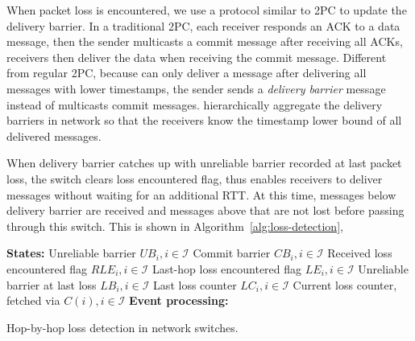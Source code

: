 When packet loss is encountered, we use a protocol similar to 2PC to update the delivery barrier. 
In a traditional 2PC, each receiver responds an ACK to a data message, then the sender multicasts a commit message after receiving all ACKs, receivers then deliver the data when receiving the commit message.
Different from regular 2PC, because \sys can only deliver a message after delivering all messages with lower timestamps, the sender sends a \textit{delivery barrier} message instead of multicasts commit messages. \sys hierarchically aggregate the delivery barriers in network so that the receivers know the timestamp lower bound of all delivered messages.

When delivery barrier catches up with unreliable barrier recorded at last packet loss, the switch clears loss encountered flag, thus enables receivers to deliver messages without waiting for an additional RTT.
At this time, messages below delivery barrier are received and messages above that are not lost before passing through this switch. This is shown in Algorithm~\ref{alg:loss-detection}, 




\setlength{\textfloatsep}{1em}
\begin{algorithm}[t]
 \DontPrintSemicolon
 \textbf{States:} Unreliable barrier $UB_i, i \in \mathcal{I}$\;
 	\qquad Commit barrier $CB_i, i \in \mathcal{I}$\;
    \qquad Received loss encountered flag $RLE_i, i \in \mathcal{I}$\;
 	\qquad Last-hop loss encountered flag $LE_i, i \in \mathcal{I}$\;
    \qquad Unreliable barrier at last loss $LB_i, i \in \mathcal{I}$\;
    \qquad Last loss counter $LC_i, i \in \mathcal{I}$\;
    \qquad Current loss counter, fetched via $C(i), i \in \mathcal{I}$\;
 \textbf{Event processing:}\\
 \caption{Hop-by-hop loss detection in network switches.}
 \label{alg:loss-detection}
\end{algorithm}

